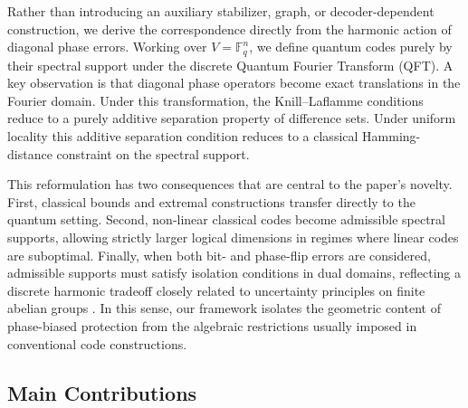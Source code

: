\documentclass[a4paper,twocolumn,11pt,allowtoday]{quantumarticle}
\theoremstyle{plain}
\theoremstyle{definition}
\theoremstyle{remark}
\begin{document}
Rather than introducing an auxiliary stabilizer, graph, or decoder-dependent construction, we derive the correspondence directly from the harmonic action of diagonal phase errors.  Working over $V=\mathbb{F}_q^n$, we define quantum codes purely by their spectral support under the discrete Quantum Fourier Transform (QFT). A key observation is that diagonal phase operators become exact translations in the Fourier domain. Under this transformation, the Knill–Laflamme conditions reduce to a purely additive separation property of difference sets. Under uniform locality this additive separation condition reduces to a classical Hamming-distance constraint on the spectral support. 

This reformulation has two consequences that are central to the paper’s novelty. First, classical bounds and extremal constructions transfer directly to the quantum setting. Second, non-linear classical codes become admissible spectral supports, allowing strictly larger logical dimensions in regimes where linear codes are suboptimal. Finally, when both bit- and phase-flip errors are considered, admissible supports must satisfy isolation conditions in dual domains, reflecting a discrete harmonic tradeoff closely related to uncertainty principles on finite abelian groups \cite{DonohoStark1989}. In this sense, our framework isolates the geometric content of phase-biased protection from the algebraic restrictions usually imposed in conventional code constructions.





\subsection{Main Contributions}
\end{document}

